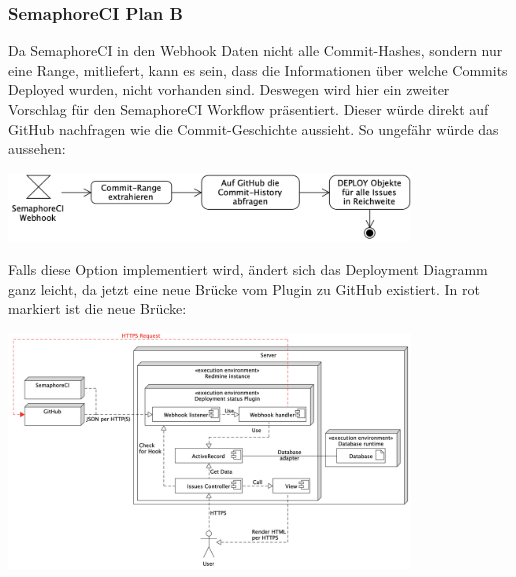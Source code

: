 \begin{minipage}{\textwidth}
  \subsubsection{SemaphoreCI Plan B}
  Da SemaphoreCI in den Webhook Daten nicht alle Commit-Hashes, sondern nur eine Range, mitliefert, kann es sein, dass die
  Informationen über welche Commits Deployed wurden, nicht vorhanden sind. Deswegen wird hier ein zweiter Vorschlag für den
  SemaphoreCI Workflow präsentiert. Dieser würde direkt auf GitHub nachfragen wie die Commit-Geschichte aussieht. So
  ungefähr würde das aussehen: \newline
  \begin{center}
    \includegraphics[width=0.8\textwidth]{images/activity/semaphore-backup-hooks.png}
    \label{fig:activity_plan_b}
    \newline
  \end{center}
  Falls diese Option implementiert wird, ändert sich das Deployment Diagramm ganz leicht, da jetzt
  eine neue Brücke vom Plugin zu GitHub existiert. In rot markiert ist die neue Brücke: \newline
  \begin{center}
    \includegraphics[width=0.8\textwidth]{images/deployment/backup-hooks.png}
    \label{fig:activity_plan_b_deployment}
  \end{center}
\end{minipage}

